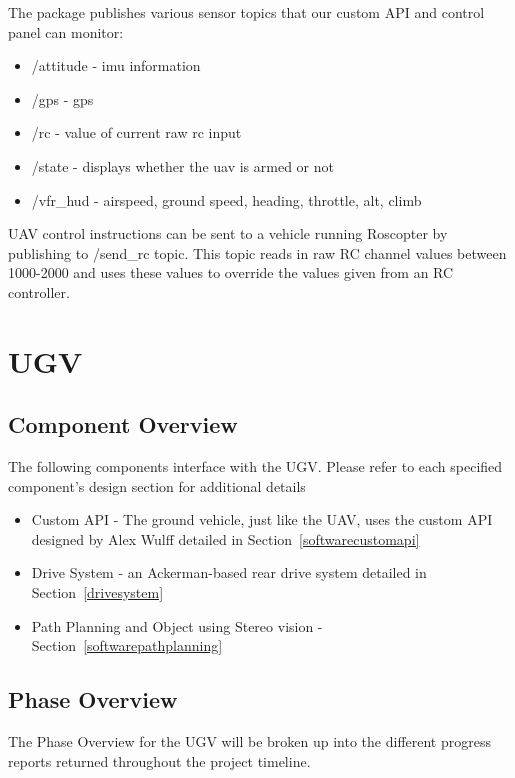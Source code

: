 The package publishes various sensor topics that our custom API and control panel can monitor:
\begin{itemize}
	\item /attitude - imu information
	\item /gps - gps
	\item /rc - value of current raw rc input
	\item /state - displays whether the uav is armed or not
	\item /vfr\_hud - airspeed, ground speed, heading, throttle, alt, climb
\end{itemize}

UAV control instructions can be sent to a vehicle running Roscopter by publishing to /send\_rc topic. This topic reads in raw RC channel values between 1000-2000 and uses these values to override the values given from an RC controller.


\section{UGV }\label{ugv}

\subsection{Component  Overview}
The following components interface with the UGV. Please refer to each specified component's design section for additional details
\begin{itemize}
	\item Custom API - The ground vehicle, just like the UAV, uses the custom API designed by Alex Wulff detailed in Section~\ref{softwarecustomapi}
	\item Drive System - an Ackerman-based rear drive system detailed in Section~\ref{drivesystem}
	\item Path Planning and Object using Stereo vision - Section~\ref{softwarepathplanning}
\end{itemize}


\subsection{Phase Overview}
The Phase Overview for the UGV will be broken up into the different progress reports returned throughout the project timeline.

